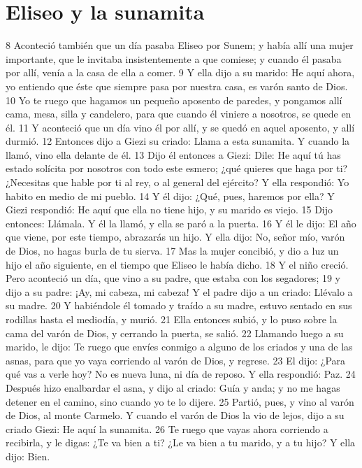 \section*{Eliseo y la sunamita}

8 Aconteció también que un día pasaba Eliseo por Sunem; y había allí una mujer importante, que le invitaba insistentemente a que comiese; y cuando él pasaba por allí, venía a la casa de ella a comer.
9 Y ella dijo a su marido: He aquí ahora, yo entiendo que éste que siempre pasa por nuestra casa, es varón santo de Dios.
10 Yo te ruego que hagamos un pequeño aposento de paredes, y pongamos allí cama, mesa, silla y candelero, para que cuando él viniere a nosotros, se quede en él.
11 Y aconteció que un día vino él por allí, y se quedó en aquel aposento, y allí durmió.
12 Entonces dijo a Giezi su criado: Llama a esta sunamita. Y cuando la llamó, vino ella delante de él.
13 Dijo él entonces a Giezi: Dile: He aquí tú has estado solícita por nosotros con todo este esmero; ¿qué quieres que haga por ti? ¿Necesitas que hable por ti al rey, o al general del ejército? Y ella respondió: Yo habito en medio de mi pueblo.
14 Y él dijo: ¿Qué, pues, haremos por ella? Y Giezi respondió: He aquí que ella no tiene hijo, y su marido es viejo.
15 Dijo entonces: Llámala. Y él la llamó, y ella se paró a la puerta.
16 Y él le dijo: El año que viene, por este tiempo, abrazarás un hijo. Y ella dijo: No, señor mío, varón de Dios, no hagas burla de tu sierva.
17 Mas la mujer concibió, y dio a luz un hijo el año siguiente, en el tiempo que Eliseo le había dicho.
18 Y el niño creció. Pero aconteció un día, que vino a su padre, que estaba con los segadores;
19 y dijo a su padre: ¡Ay, mi cabeza, mi cabeza! Y el padre dijo a un criado: Llévalo a su madre.
20 Y habiéndole él tomado y traído a su madre, estuvo sentado en sus rodillas hasta el mediodía, y murió.
21 Ella entonces subió, y lo puso sobre la cama del varón de Dios, y cerrando la puerta, se salió.
22 Llamando luego a su marido, le dijo: Te ruego que envíes conmigo a alguno de los criados y una de las asnas, para que yo vaya corriendo al varón de Dios, y regrese.
23 El dijo: ¿Para qué vas a verle hoy? No es nueva luna, ni día de reposo. Y ella respondió: Paz.
24 Después hizo enalbardar el asna, y dijo al criado: Guía y anda; y no me hagas detener en el camino, sino cuando yo te lo dijere.
25 Partió, pues, y vino al varón de Dios, al monte Carmelo. Y cuando el varón de Dios la vio de lejos, dijo a su criado Giezi: He aquí la sunamita.
26 Te ruego que vayas ahora corriendo a recibirla, y le digas: ¿Te va bien a ti? ¿Le va bien a tu marido, y a tu hijo? Y ella dijo: Bien.
